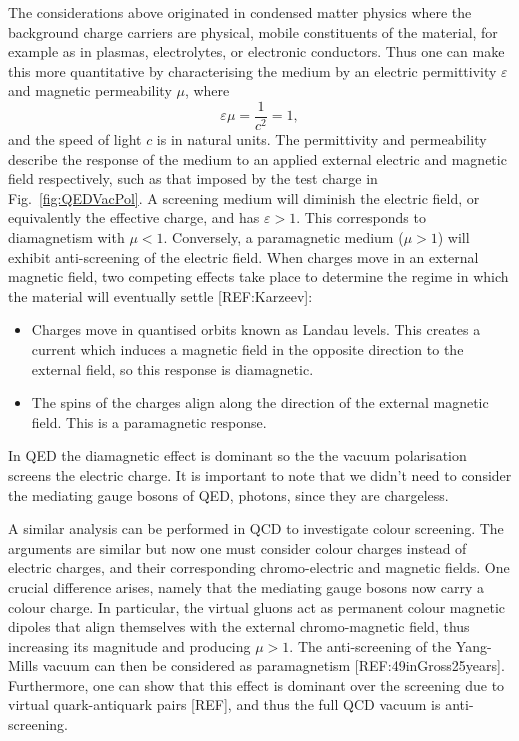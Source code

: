 \documentclass[12pt, a4paper, twoside]{book}
\begin{document}
The considerations above originated in condensed matter physics where the background charge carriers are physical, mobile constituents of the material, for example as in plasmas, electrolytes, or electronic conductors. Thus one can make this more quantitative by characterising the medium by an electric permittivity \(\varepsilon\) and magnetic permeability \(\mu\), where
\begin{equation}
\varepsilon\mu=\frac{1}{c^2}=1,
\end{equation} 
and the speed of light \(c\) is in natural units. The permittivity and permeability describe the response of the medium to an applied external electric and magnetic field respectively, such as that imposed by the test charge in Fig.~\ref{fig:QEDVacPol}. A screening medium will diminish the electric field, or equivalently the effective charge, and has \(\varepsilon >1\). This corresponds to diamagnetism with \(\mu <1\). Conversely, a paramagnetic medium (\(\mu >1\)) will exhibit anti-screening of the electric field. When charges move in an external magnetic field, two competing effects take place to determine the regime in which the material will eventually settle [REF:Karzeev]:
\begin{itemize}
\item{Charges move in quantised orbits known as Landau levels. This creates a current which induces a magnetic field in the opposite direction to the external field, so this response is diamagnetic.}
\item{The spins of the charges align along the direction of the external magnetic field. This is a paramagnetic response.}
\end{itemize}
In QED the diamagnetic effect is dominant so the the vacuum polarisation screens the electric charge. It is important to note that we didn't need to consider the mediating gauge bosons of QED, photons, since they are chargeless.

A similar analysis can be performed in QCD to investigate colour screening. The arguments are similar but now one must consider colour charges instead of electric charges, and their corresponding chromo-electric and magnetic fields. One crucial difference arises, namely that the mediating gauge bosons now carry a colour charge. In particular, the virtual gluons act as permanent colour magnetic dipoles that align themselves with the external chromo-magnetic field, thus increasing its magnitude and producing \(\mu >1\). The anti-screening of the Yang-Mills vacuum can then be considered as paramagnetism [REF:49inGross25years]. Furthermore, one can show that this effect is dominant over the screening due to virtual quark-antiquark pairs [REF], and thus the full QCD vacuum is anti-screening.  
\end{document}
